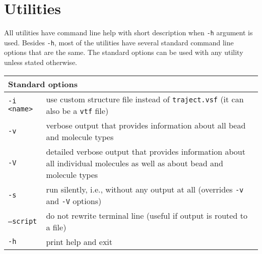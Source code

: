 \chapter{Utilities} \label{chap:Utils}

All utilities have command line help with short description when
\texttt{-h} argument is used. Besides \texttt{-h}, most of the utilities
have several standard command line options that are the same. The standard
options can be used with any utility unless stated otherwise.

\vspace{1em}
\noindent
\begin{tabular}{p{}p{}}
  \toprule
  \multicolumn{2}{l}{Standard options} \\
  \midrule
  \texttt{-i <name>} & use custom structure file instead of
    \texttt{traject.vsf} (it can also be a \texttt{vtf} file) \\
  \texttt{-v}        & verbose output that provides information about all
    bead and molecule types \\
  \texttt{-V}        & detailed verbose output that provides
    information about all individual molecules as well as about bead and
    molecule types \\
  \texttt{-s}        & run silently, i.e., without any output at all
    (overrides \texttt{-v} and \texttt{-V} options) \\
  \texttt{--script}  & do not rewrite terminal line (useful if output is
    routed to a file) \\
  \texttt{-h}        & print help and exit \\
  \bottomrule
\end{tabular}












%











